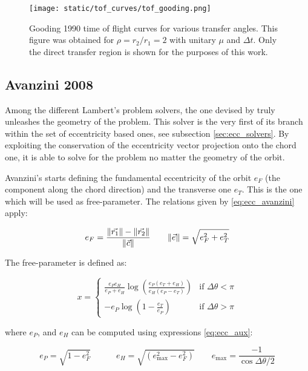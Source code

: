\vspace{0.5cm}
\begin{figure}[h]
  \centering
  \texttt{[image: static/tof\_curves/tof\_gooding.png]}
  \caption{Gooding 1990 time of flight curves for various transfer angles. This
  figure was obtained for $\rho=r_2/r_1=2$ with unitary $\mu$ and $\Delta t$.
  Only the direct transfer region is shown for the purposes of this work.}
  \label{fig:tof_gooding}
\end{figure}


\subsection{Avanzini 2008}

Among the different Lambert's problem solvers, the one devised by
\cite{avanzini2008} truly unleashes the geometry of the problem. This solver is
the very first of its branch within the set of eccentricity based ones, see
subsection \ref{sec:ecc_solvers}. By exploiting the conservation of the
eccentricity vector projection onto the chord one, it is able to solve for the
problem no matter the geometry of the orbit.

Avanzini's starts defining the fundamental eccentricity of the orbit $e_F$ (the
component along the chord direction) and the transverse one $e_T$. This is the
one which will be used as free-parameter. The relations given by
\ref{eq:ecc_avanzini} apply:

\begin{equation}
	e_F = \frac{\lVert\vec{r_1}\rVert - \lVert\vec{r_2}\rVert}{\lVert\vec{c}\rVert}\quad\quad
	\lVert\vec{e}\rVert = \sqrt{e_F^2 + e_T^2}
	\label{eq:ecc_avanzini}
\end{equation}

The free-parameter is defined as:

\begin{equation}
  x =
  \begin{cases}
    \frac{e_P e_H}{e_P + e_H}\log{\left(\frac{e_P(e_T + e_H)}{e_H(e_P - e_T)}\right)} & \text{if $\Delta \theta < \pi$}\\
    -e_P \log{\left(1 - \frac{e_T}{e_P} \right)} & \text{if $\Delta \theta > \pi$}
  \end{cases}
\end{equation}

where $e_P$, and $e_H$ can be computed using expressions \ref{eq:ecc_aux}:

\begin{equation}
  e_P = \sqrt{1 - e_F^2}\quad\quad\quad
  e_H = \sqrt{(e_\text{max}^2 - e_F^2)}\quad\quad
  e_\text{max} = \frac{-1}{\cos{\Delta \theta / 2}}
  \label{eq:ecc_aux}
\end{equation}

